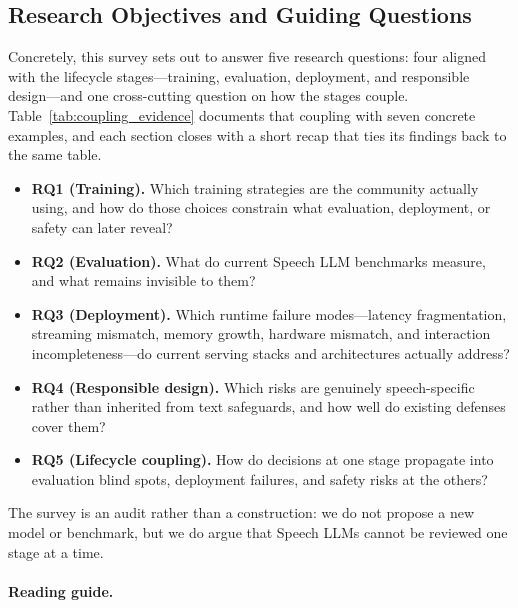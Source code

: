 \subsection{Research Objectives and Guiding Questions}
\label{sec:research_objectives}
Concretely, this survey sets out to answer five research questions: four
aligned with the lifecycle stages---training, evaluation, deployment, and
responsible design---and one cross-cutting question on how the stages couple.
Table~\ref{tab:coupling_evidence} documents that coupling with seven concrete
examples, and each section closes with a short recap that ties its findings
back to the same table.
\begin{itemize}
  \item \textbf{RQ1 (Training).} Which training strategies are the community actually using, and how do those choices constrain what evaluation, deployment, or safety can later reveal?
  \item \textbf{RQ2 (Evaluation).} What do current Speech LLM benchmarks measure, and what remains invisible to them?
  \item \textbf{RQ3 (Deployment).} Which runtime failure modes---latency fragmentation, streaming mismatch, memory growth, hardware mismatch, and interaction incompleteness---do current serving stacks and architectures actually address?
  \item \textbf{RQ4 (Responsible design).} Which risks are genuinely speech-specific rather than inherited from text safeguards, and how well do existing defenses cover them?
  \item \textbf{RQ5 (Lifecycle coupling).} How do decisions at one stage propagate into evaluation blind spots, deployment failures, and safety risks at the others?
\end{itemize}
The survey is an audit rather than a construction: we do not propose a new
model or benchmark, but we do argue that Speech LLMs cannot be reviewed one
stage at a time.

\paragraph{Reading guide.}


